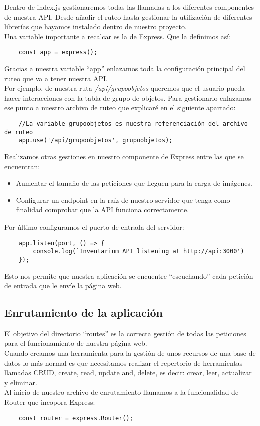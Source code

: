 Dentro de index.js gestionaremos todas las llamadas a los diferentes componentes de nuestra API. Desde añadir el ruteo hasta gestionar la utilización de diferentes librerías que hayamos instalado dentro de nuestro proyecto.
\\Una variable importante a recalcar es la de Express. Que la definimos así:
\begin{verbatim}
    const app = express();
\end{verbatim}
Gracias a nuestra variable ``app'' enlazamos toda la configuración principal del ruteo que va a tener nuestra API.
\\Por ejemplo, de nuestra ruta \textit{/api/grupoobjetos} queremos que el usuario pueda hacer interacciones con la tabla de grupo de objetos. Para gestionarlo enlazamos ese punto a nuestro archivo de ruteo que explicaré en el siguiente apartado:
\begin{verbatim}
    //La variable grupoobjetos es nuestra referenciación del archivo de ruteo
    app.use('/api/grupoobjetos', grupoobjetos); 
\end{verbatim}
Realizamos otras gestiones en nuestro componente de Express entre las que se encuentran:
\begin{itemize}
    \item Aumentar el tamaño de las peticiones que lleguen para la carga de imágenes.
    \item Configurar un endpoint en la raíz de nuestro servidor que tenga como finalidad comprobar que la API funciona correctamente.
\end{itemize}
Por último configuramos el puerto de entrada del servidor:
\begin{verbatim}
    app.listen(port, () => {
        console.log(`Inventarium API listening at http://api:3000')
    });
\end{verbatim}
Esto nos permite que nuestra aplicación se encuentre ``escuchando'' cada petición de entrada que le envíe la página web.

\subsection{Enrutamiento de la aplicación}
El objetivo del directorio ``routes'' es la correcta gestión de todas las peticiones para el funcionamiento de nuestra página web.
\\Cuando creamos una herramienta para la gestión de unos recursos de una base de datos lo más normal es que necesitamos realizar el repertorio de herramientas llamadas CRUD, create, read, update and, delete, es decir: crear, leer, actualizar y eliminar.
\\Al inicio de nuestro archivo de enrutamiento llamamos a la funcionalidad de Router que incopora Express:
\begin{verbatim}
    const router = express.Router();
\end{verbatim}

